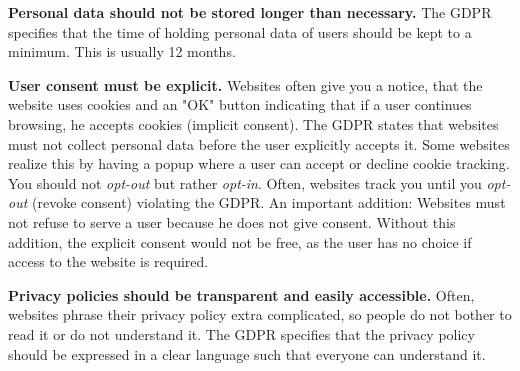 \textbf{Personal data should not be stored longer than necessary.} The GDPR specifies that the time of holding personal data of
users should be kept to a minimum. This is usually 12 months.

\textbf{User consent must be explicit.} Websites often give you a notice, that the website uses cookies and an "OK" button
indicating that if a user continues browsing, he accepts cookies (implicit consent). The GDPR states
that websites must not collect personal data before the user explicitly accepts it. Some websites realize
this by having a popup where a user can accept or decline cookie tracking. You should not
\emph{opt-out} but rather \emph{opt-in}. Often, websites track you until you \emph{opt-out} (revoke consent) violating
the GDPR. An important addition: Websites must not refuse to serve a user because he does not give consent. Without this
addition, the explicit consent would not be free, as the user has no choice if access to the website is required.

\textbf{Privacy policies should be transparent and easily accessible.} Often, websites phrase their privacy policy
extra complicated, so people do not bother to read it or do not understand it. The GDPR specifies that the privacy policy
should be expressed in a clear language such that everyone can understand it.

